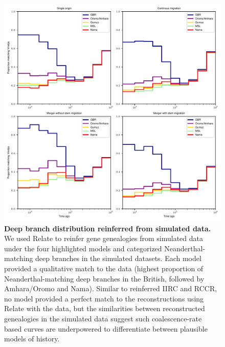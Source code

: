 \documentclass[]{article}
\begin{document}
\begin{figure}[ht]
    \centering
    \includegraphics[width=\textwidth]{figures/supp-deep-branches-sim}
    \caption{
        \textbf{Deep branch distribution reinferred from simulated data.} We
        used Relate to reinfer gene genealogies from simulated data under the
        four highlighted models and categorized Neanderthal-matching deep
        branches in the simulated datasets. Each model provided a qualitative
        match to the data (highest proportion of Neanderthal-matching deep
        branches in the British, followed by Amhara/Oromo and Nama). Similar to
        reinferred IIRC and RCCR, no model provided a perfect match to the
        reconstructions using Relate with the data, but the similarities
        between reconstructed genealogies in the simulated data suggest such
        coalescence-rate based curves are underpowered to differentiate between
        plausible models of history.
    }
    \label{fig:supp-deep-branches-sim}
\end{figure}
\end{document}

